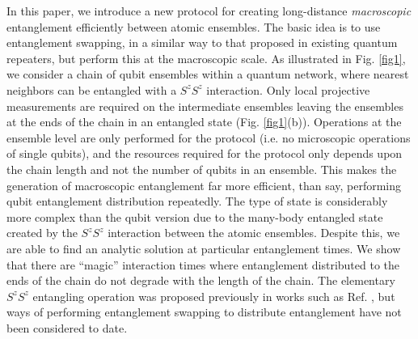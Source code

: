 \documentclass{WileyMSP-template}
\begin{document}
In this paper, we introduce a new protocol for creating long-distance {\it macroscopic} entanglement efficiently between atomic ensembles. The basic idea is to use entanglement swapping, in a similar way to that proposed in existing quantum repeaters, but perform this at the macroscopic scale. As illustrated in Fig. \ref{fig1}, we consider a chain of qubit ensembles within a quantum network, where nearest neighbors can be entangled with a $S^z S^z$ interaction.  Only local projective measurements are required on the intermediate ensembles leaving the ensembles at the ends of the chain in an entangled state (Fig. \ref{fig1}(b)).  Operations at the ensemble level are only performed for the protocol (i.e. no microscopic operations of single qubits), and the resources required for the protocol only depends upon the chain length and not the number of qubits in an ensemble.  This makes the generation of macroscopic entanglement far more efficient, than say, performing qubit entanglement distribution repeatedly.  The type of state is considerably more complex than the qubit version due to the many-body entangled state created by the $S^z S^z$ interaction between the atomic ensembles. Despite this, we are able to find an analytic solution at particular entanglement times.  We show that there are ``magic'' interaction times  where entanglement distributed to the ends of the chain do not degrade with the length of the chain.  The elementary $S^z S^z$ entangling operation was proposed previously in works such as Ref. \cite{pyrkov2013entanglement,rosseau2014}, but ways of performing entanglement swapping to distribute entanglement have not been considered to date. 
\end{document}
